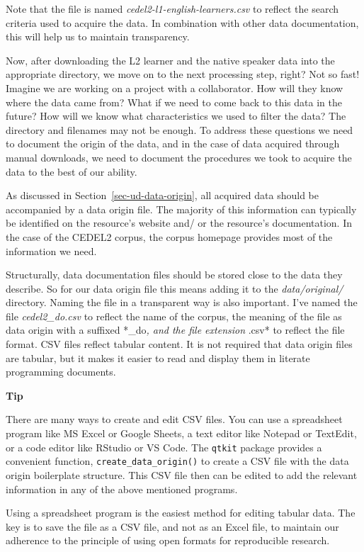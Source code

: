 \documentclass[
  letterpaper,
]{latex/krantz}
\theoremstyle{definition}
\theoremstyle{remark}
\begin{document}
Note that the file is named \emph{cedel2-l1-english-learners.csv} to
reflect the search criteria used to acquire the data. In combination
with other data documentation, this will help us to maintain
transparency.

Now, after downloading the L2 learner and the native speaker data into
the appropriate directory, we move on to the next processing step,
right? Not so fast! Imagine we are working on a project with a
collaborator. How will they know where the data came from? What if we
need to come back to this data in the future? How will we know what
characteristics we used to filter the data? The directory and filenames
may not be enough. To address these questions we need to document the
origin of the data, and in the case of data acquired through manual
downloads, we need to document the procedures we took to acquire the
data to the best of our ability.

As discussed in Section~\ref{sec-ud-data-origin}, all acquired data
should be accompanied by a data origin file. The majority of this
information can typically be identified on the resource's website and/
or the resource's documentation. In the case of the CEDEL2 corpus, the
corpus homepage provides most of the information we need.

Structurally, data documentation files should be stored close to the
data they describe. So for our data origin file this means adding it to
the \emph{data/original/} directory. Naming the file in a transparent
way is also important. I've named the file \emph{cedel2\_do.csv} to
reflect the name of the corpus, the meaning of the file as data origin
with a suffixed *\_do\emph{, and the file extension }.csv* to reflect
the file format. CSV files reflect tabular content. It is not required
that data origin files are tabular, but it makes it easier to read and
display them in literate programming documents.

\begin{tcolorbox}[enhanced jigsaw, breakable, leftrule=.75mm, arc=.35mm, colframe=quarto-callout-color-frame, colback=white, left=2mm, bottomrule=.15mm, rightrule=.15mm, toprule=.15mm, opacityback=0]

\textbf{ Tip}

There are many ways to create and edit CSV files. You can use a
spreadsheet program like MS Excel or Google Sheets, a text editor like
Notepad or TextEdit, or a code editor like RStudio or VS Code. The
\texttt{qtkit} package provides a convenient function,
\texttt{create\_data\_origin()} to create a CSV file with the data
origin boilerplate structure. This CSV file then can be edited to add
the relevant information in any of the above mentioned programs.

Using a spreadsheet program is the easiest method for editing tabular
data. The key is to save the file as a CSV file, and not as an Excel
file, to maintain our adherence to the principle of using open formats
for reproducible research.

\end{tcolorbox}
\end{document}
